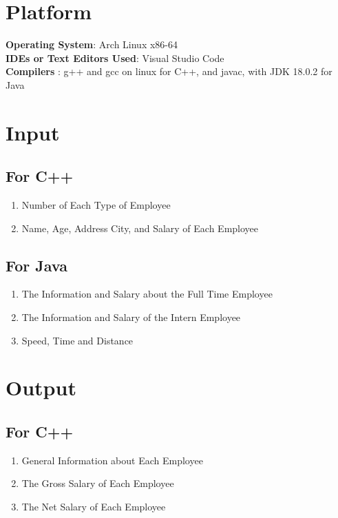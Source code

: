 \documentclass[11pt]{article}
\begin{document}
\section{Platform}
\textbf{Operating System}: Arch Linux x86-64\\
\textbf{IDEs or Text Editors Used}: Visual Studio Code\\
\textbf{Compilers} : g++ and gcc on linux for C++, and javac, with JDK 18.0.2 for Java\\

\section{Input}

\subsection*{For C++}
\begin{enumerate}
	\item Number of Each Type of Employee
	\item Name, Age, Address City, and Salary of Each Employee
\end{enumerate}

\subsection*{For Java}
\begin{enumerate}
	\item The Information and Salary about the Full Time Employee
	\item The Information and Salary of the Intern Employee
	\item Speed, Time and Distance
\end{enumerate}

\section{Output}
\subsection*{For C++}
\begin{enumerate}
	\item General Information about Each Employee
	\item The Gross Salary of Each Employee
	\item The Net Salary of Each Employee
\end{enumerate}
\end{document}
